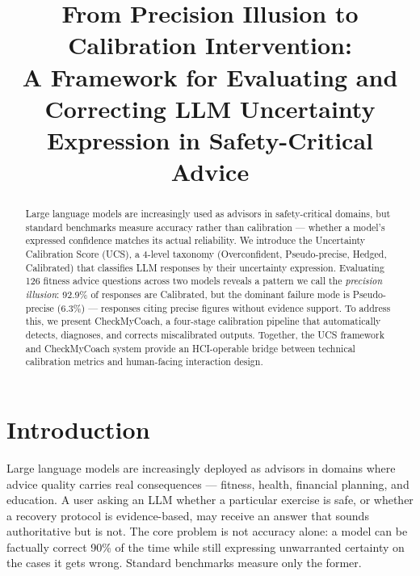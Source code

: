 \documentclass[manuscript, review, anonymous]{acmart}
\title{From Precision Illusion to Calibration Intervention:\\A Framework for Evaluating and Correcting LLM Uncertainty Expression in Safety-Critical Advice}
\begin{document}
\begin{abstract}
Large language models are increasingly used as advisors in safety-critical domains, but standard benchmarks measure accuracy rather than calibration — whether a model's expressed confidence matches its actual reliability. We introduce the Uncertainty Calibration Score (UCS), a 4-level taxonomy (Overconfident, Pseudo-precise, Hedged, Calibrated) that classifies LLM responses by their uncertainty expression. Evaluating 126 fitness advice questions across two models reveals a pattern we call the \emph{precision illusion}: 92.9\% of responses are Calibrated, but the dominant failure mode is Pseudo-precise (6.3\%) — responses citing precise figures without evidence support. To address this, we present CheckMyCoach, a four-stage calibration pipeline that automatically detects, diagnoses, and corrects miscalibrated outputs. Together, the UCS framework and CheckMyCoach system provide an HCI-operable bridge between technical calibration metrics and human-facing interaction design.
\end{abstract}



\maketitle

\section{Introduction}
\label{sec:introduction}

Large language models are increasingly deployed as advisors in domains where advice quality carries real consequences — fitness, health, financial planning, and education. A user asking an LLM whether a particular exercise is safe, or whether a recovery protocol is evidence-based, may receive an answer that sounds authoritative but is not. The core problem is not accuracy alone: a model can be factually correct 90\% of the time while still expressing unwarranted certainty on the cases it gets wrong. Standard benchmarks measure only the former.
\end{document}
